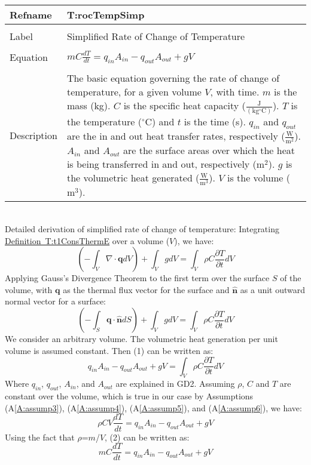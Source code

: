 \documentclass[12pt]{article}
\begin{document}
\noindent \begin{minipage}{\textwidth}
\begin{tabular}{p{} p{}}
\toprule \textbf{Refname} & \textbf{T:rocTempSimp}
\label{T:rocTempSimp}
\\ \midrule \\
Label & Simplified Rate of Change of Temperature
\\ \midrule \\
Equation & $m C \frac{d T}{d t}={q_{in}} {A_{in}}-{q_{out}} {A_{out}}+g V$
\\ \midrule \\
Description & The basic equation governing the rate of change of temperature, for a given volume $V$, with time. $m$ is the mass (kg). $C$ is the specific heat capacity ($\frac{\text{J}}{(\text{kg}{}^{\circ}\text{C})}$). $T$ is the temperature (${}^{\circ}$C) and $t$ is the time (s). ${q_{in}}$ and ${q_{out}}$ are the in and out heat transfer rates, respectively ($\frac{\text{W}}{\text{m}^{2}}$). ${A_{in}}$ and ${A_{out}}$ are the surface areas over which the heat is being transferred in and out, respectively ($\text{m}^{2}$). $g$ is the volumetric heat generated ($\frac{\text{W}}{\text{m}^{3}}$). $V$ is the volume ($\text{m}^{3}$).
\\ \bottomrule \end{tabular}
\end{minipage}\\
Detailed derivation of simplified rate of change of temperature:
Integrating \hyperref[T:t1ConsThermE]{Definition~T:t1ConsThermE} over a volume ($V$), we have:
\begin{dmath}
\left(-\int_{V}{\nabla{}\cdot{}\mathbf{q}dV}\right)+\int_{V}{gdV}=\int_{V}{\rho{} C \frac{\partial{} T}{\partial{} t}dV}
\end{dmath}
Applying Gauss's Divergence Theorem to the first term over the surface $S$ of the volume, with $\mathbf{q}$ as the thermal flux vector for the surface and $\mathbf{\hat{n}}$ as a unit outward normal vector for a surface:
\begin{dmath}
\left(-\int_{S}{\mathbf{q}\cdot{}\mathbf{\hat{n}}dS}\right)+\int_{V}{gdV}=\int_{V}{\rho{} C \frac{\partial{} T}{\partial{} t}dV}
\end{dmath}
We consider an arbitrary volume. The volumetric heat generation per unit volume is assumed constant. Then (1) can be written as:
\begin{dmath}
{q_{in}} {A_{in}}-{q_{out}} {A_{out}}+g V=\int_{V}{\rho{} C \frac{\partial{} T}{\partial{} t}dV}
\end{dmath}
Where ${q_{in}}$, ${q_{out}}$, ${A_{in}}$, and ${A_{out}}$ are explained in GD2. Assuming $\rho{}$, $C$ and $T$ are constant over the volume, which is true in our case by Assumptions (A\ref{A:assump3}), (A\ref{A:assump4}), (A\ref{A:assump5}), and (A\ref{A:assump6}), we have:
\begin{dmath}
\rho{} C V \frac{d T}{d t}={q_{in}} {A_{in}}-{q_{out}} {A_{out}}+g V
\end{dmath}
Using the fact that $\rho{}$=$m$/$V$, (2) can be written as:
\begin{dmath}
m C \frac{d T}{d t}={q_{in}} {A_{in}}-{q_{out}} {A_{out}}+g V
\end{dmath}
\end{document}
